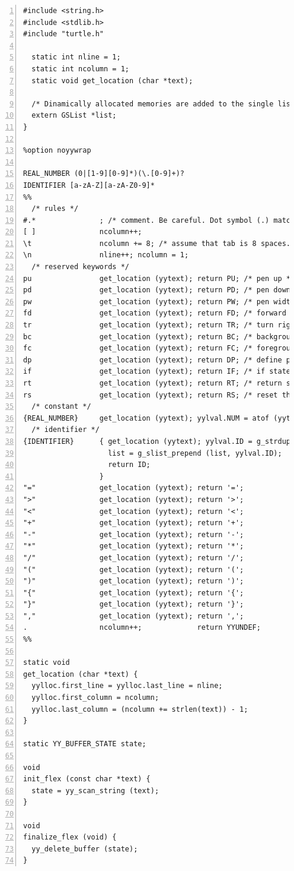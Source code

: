\begin{lstlisting}[numbers=left]
%top{
#include <string.h>
#include <stdlib.h>
#include "turtle.h"

  static int nline = 1;
  static int ncolumn = 1;
  static void get_location (char *text);

  /* Dinamically allocated memories are added to the single list. They will be freed in the finalize function. */
  extern GSList *list;
}

%option noyywrap

REAL_NUMBER (0|[1-9][0-9]*)(\.[0-9]+)?
IDENTIFIER [a-zA-Z][a-zA-Z0-9]*
%%
  /* rules */
#.*               ; /* comment. Be careful. Dot symbol (.) matches any character but new line. */
[ ]               ncolumn++;
\t                ncolumn += 8; /* assume that tab is 8 spaces. */
\n                nline++; ncolumn = 1;
  /* reserved keywords */
pu                get_location (yytext); return PU; /* pen up */
pd                get_location (yytext); return PD; /* pen down */
pw                get_location (yytext); return PW; /* pen width = line width */
fd                get_location (yytext); return FD; /* forward */
tr                get_location (yytext); return TR; /* turn right */
bc                get_location (yytext); return BC; /* background color */
fc                get_location (yytext); return FC; /* foreground color */
dp                get_location (yytext); return DP; /* define procedure */
if                get_location (yytext); return IF; /* if statement */
rt                get_location (yytext); return RT; /* return statement */
rs                get_location (yytext); return RS; /* reset the status */
  /* constant */
{REAL_NUMBER}     get_location (yytext); yylval.NUM = atof (yytext); return NUM;
  /* identifier */
{IDENTIFIER}      { get_location (yytext); yylval.ID = g_strdup(yytext);
                    list = g_slist_prepend (list, yylval.ID);
                    return ID;
                  }
"="               get_location (yytext); return '=';
">"               get_location (yytext); return '>';
"<"               get_location (yytext); return '<';
"+"               get_location (yytext); return '+';
"-"               get_location (yytext); return '-';
"*"               get_location (yytext); return '*';
"/"               get_location (yytext); return '/';
"("               get_location (yytext); return '(';
")"               get_location (yytext); return ')';
"{"               get_location (yytext); return '{';
"}"               get_location (yytext); return '}';
","               get_location (yytext); return ',';
.                 ncolumn++;             return YYUNDEF;
%%

static void
get_location (char *text) {
  yylloc.first_line = yylloc.last_line = nline;
  yylloc.first_column = ncolumn;
  yylloc.last_column = (ncolumn += strlen(text)) - 1;
}

static YY_BUFFER_STATE state;

void
init_flex (const char *text) {
  state = yy_scan_string (text);
}

void
finalize_flex (void) {
  yy_delete_buffer (state);
}
\end{lstlisting}

